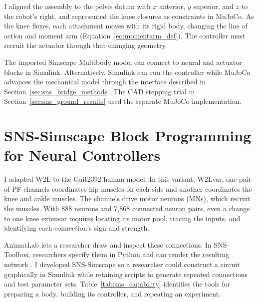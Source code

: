 I aligned the assembly to the pelvis datum with $x$ anterior, $y$ superior, and $z$ to the robot's right, and represented the knee closures as constraints in MuJoCo. As the knee flexes, each attachment moves with its rigid body, changing the line of action and moment arm (Equation~\ref{eq:momentarm_def}). The controller must recruit the actuator through that changing geometry.

The imported Simscape Multibody model can connect to neural and actuator blocks in Simulink. Alternatively, Simulink can run the controller while MuJoCo advances the mechanical model through the interface described in Section~\ref{sec:sns_bridge_methods}. The CAD stepping trial in Section~\ref{sec:sns_ground_results} used the separate MuJoCo implementation.

\section{SNS-Simscape Block Programming for Neural Controllers}\label{sec:sns_new_tools}\label{sec:w2l_matlab_attempt}

I adapted W2L to the Gait2392 human model. In this variant, W2Lvar, one pair of PF channels coordinates hip muscles on each side and another coordinates the knee and ankle muscles. The channels drive motor neurons (MNs), which recruit the muscles. With 888 neurons and 7,868 connected neuron pairs, even a change to one knee extensor requires locating its motor pool, tracing the inputs, and identifying each connection's sign and strength.

AnimatLab lets a researcher draw and inspect these connections. In SNS-Toolbox, researchers specify them in Python and can render the resulting network \citep{cofer_animatlab_2010,nourse_sns_2023}. I developed SNS-Simscape so a researcher could construct a circuit graphically in Simulink while retaining scripts to generate repeated connections and test parameter sets. Table~\ref{tab:sns_capability} identifies the tools for preparing a body, building its controller, and repeating an experiment.

